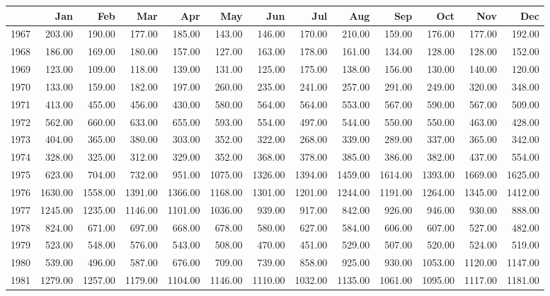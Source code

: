 \begin{longtable}{rrrrrrrrrrrrr}
  \hline
 & Jan & Feb & Mar & Apr & May & Jun & Jul & Aug & Sep & Oct & Nov & Dec \\ 
  \hline
1967 & 203.00 & 190.00 & 177.00 & 185.00 & 143.00 & 146.00 & 170.00 & 210.00 & 159.00 & 176.00 & 177.00 & 192.00 \\ 
  1968 & 186.00 & 169.00 & 180.00 & 157.00 & 127.00 & 163.00 & 178.00 & 161.00 & 134.00 & 128.00 & 128.00 & 152.00 \\ 
  1969 & 123.00 & 109.00 & 118.00 & 139.00 & 131.00 & 125.00 & 175.00 & 138.00 & 156.00 & 130.00 & 140.00 & 120.00 \\ 
  1970 & 133.00 & 159.00 & 182.00 & 197.00 & 260.00 & 235.00 & 241.00 & 257.00 & 291.00 & 249.00 & 320.00 & 348.00 \\ 
  1971 & 413.00 & 455.00 & 456.00 & 430.00 & 580.00 & 564.00 & 564.00 & 553.00 & 567.00 & 590.00 & 567.00 & 509.00 \\ 
  1972 & 562.00 & 660.00 & 633.00 & 655.00 & 593.00 & 554.00 & 497.00 & 544.00 & 550.00 & 550.00 & 463.00 & 428.00 \\ 
  1973 & 404.00 & 365.00 & 380.00 & 303.00 & 352.00 & 322.00 & 268.00 & 339.00 & 289.00 & 337.00 & 365.00 & 342.00 \\ 
  1974 & 328.00 & 325.00 & 312.00 & 329.00 & 352.00 & 368.00 & 378.00 & 385.00 & 386.00 & 382.00 & 437.00 & 554.00 \\ 
  1975 & 623.00 & 704.00 & 732.00 & 951.00 & 1075.00 & 1326.00 & 1394.00 & 1459.00 & 1614.00 & 1393.00 & 1669.00 & 1625.00 \\ 
  1976 & 1630.00 & 1558.00 & 1391.00 & 1366.00 & 1168.00 & 1301.00 & 1201.00 & 1244.00 & 1191.00 & 1264.00 & 1345.00 & 1412.00 \\ 
  1977 & 1245.00 & 1235.00 & 1146.00 & 1101.00 & 1036.00 & 939.00 & 917.00 & 842.00 & 926.00 & 946.00 & 930.00 & 888.00 \\ 
  1978 & 824.00 & 671.00 & 697.00 & 668.00 & 678.00 & 580.00 & 627.00 & 584.00 & 606.00 & 607.00 & 527.00 & 482.00 \\ 
  1979 & 523.00 & 548.00 & 576.00 & 543.00 & 508.00 & 470.00 & 451.00 & 529.00 & 507.00 & 520.00 & 524.00 & 519.00 \\ 
  1980 & 539.00 & 496.00 & 587.00 & 676.00 & 709.00 & 739.00 & 858.00 & 925.00 & 930.00 & 1053.00 & 1120.00 & 1147.00 \\ 
  1981 & 1279.00 & 1257.00 & 1179.00 & 1104.00 & 1146.00 & 1110.00 & 1032.00 & 1135.00 & 1061.00 & 1095.00 & 1117.00 & 1181.00 \\ 

\end{longtable}
